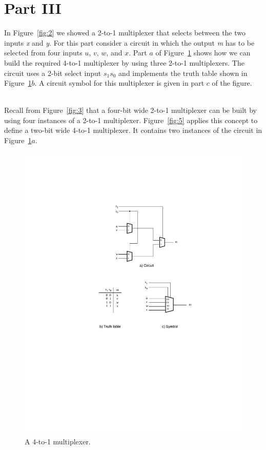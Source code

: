 \documentclass[epsfig,10pt,fullpage]{article}
\begin{document}
\section*{Part III}
In Figure~\ref{fig:2} we showed a 2-to-1 multiplexer that selects between the 
two inputs {\it x} and {\it
y}. For this part consider a circuit in which the output {\it m} has to be selected from
four inputs $u$, $v$, $w$, and $x$. Part $a$ of  Figure~\ref{fig:4} shows how we can build the
required 4-to-1 multiplexer by using three 2-to-1 multiplexers. The circuit uses a 2-bit
select input $s_1 s_0$ and implements the truth table shown in Figure~\ref{fig:4}$b$. A circuit
symbol for this multiplexer is given in part $c$ of the figure. 

~\\
Recall from  Figure~\ref{fig:3} that a four-bit wide 2-to-1 multiplexer can be built 
by using four instances of a 2-to-1
multiplexer. Figure~\ref{fig:5} applies this concept to define a two-bit wide 4-to-1 
multiplexer. It contains two instances of the circuit in  Figure~\ref{fig:4}$a$.

\begin{figure}[H]
	\begin{center}
		\includegraphics[scale=.8]{figures/figure4.pdf}
	\end{center}
\caption{A 4-to-1 multiplexer.}
\label{fig:4}
\end{figure}
\end{document}
